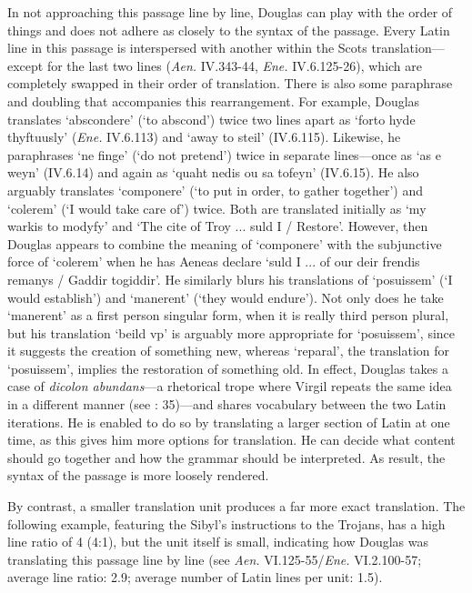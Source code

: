 \documentclass{dhbenelux}
\begin{document}
In not approaching this passage line by line, Douglas can play with the
order of things and does not adhere as closely to the syntax of the
passage. Every Latin line in this passage is interspersed with another
within the Scots translation---except for the last two lines
(\emph{Aen.} IV.343-44, \emph{Ene.} IV.6.125-26), which are completely
swapped in their order of translation. There is also some paraphrase and
doubling that accompanies this rearrangement. For example, Douglas
translates `abscondere' (`to abscond') twice two lines apart as `forto
hyde thyftuusly' (\emph{Ene.} IV.6.113) and `away to steil' (IV.6.115).
Likewise, he paraphrases `ne finge' (`do not pretend') twice in separate
lines---once as `as {\textyogh}e weyn'
(IV.6.14) and again as `quaht nedis {\textyogh}ou sa
tofeyn' (IV.6.15). He also arguably translates `componere' (`to put in
order, to gather together') and `colerem' (`I would take care of')
twice. Both are translated initially as `my warkis to modyfy' and `The
cite of Troy ... suld I / Restore'. However, then Douglas appears to
combine the meaning of `componere' with the subjunctive force of
`colerem' when he has Aeneas declare `suld I ... of our deir frendis
remanys / Gaddir togiddir'. He similarly blurs his translations of
`posuissem' (`I would establish') and `manerent' (`they would endure').
Not only does he take `manerent' as a first person singular form, when
it is really third person plural, but his translation `beild vp' is
arguably more appropriate for `posuissem', since it suggests the
creation of something new, whereas `reparal', the translation for
`posuissem', implies the restoration of something old. In effect,
Douglas takes a case of \emph{dicolon abundans}---a rhetorical trope
where Virgil repeats the same idea in a different manner (see \citeauthor{dainotti2015} \citeyear{dainotti2015}: 35)---and shares vocabulary between the two Latin
iterations. He is enabled to do so by translating a larger section of
Latin at one time, as this gives him more options for translation. He
can decide what content should go together and how the grammar should be
interpreted. As result, the syntax of the passage is more loosely
rendered.

\pagebreak
By contrast, a smaller translation unit produces a far more exact
translation. The following example, featuring the Sibyl's instructions
to the Trojans, has a high line ratio of 4 (4:1), but the unit itself is
small, indicating how Douglas was translating this passage line by line
(see \emph{Aen.} VI.125-55/\emph{Ene.} VI.2.100-57; average line ratio:
2.9; average number of Latin lines per unit: 1.5).
\end{document}
